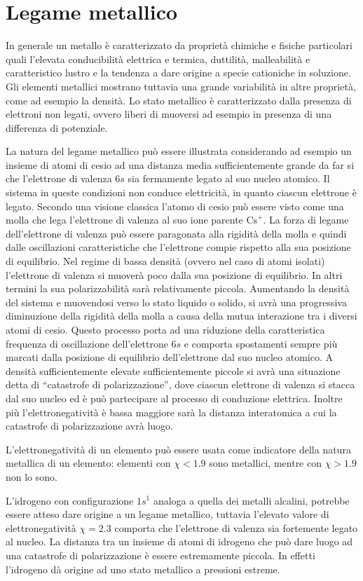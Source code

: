 \section{Legame metallico}
In generale un metallo è caratterizzato da proprietà chimiche e fisiche particolari quali l'elevata conducibilità elettrica e termica, duttilità, malleabilità e caratteristico lustro e la tendenza a dare origine a specie cationiche in soluzione. Gli elementi metallici mostrano tuttavia una grande variabilità in altre proprietà, come ad esempio la densità. Lo stato metallico è caratterizzato dalla presenza di elettroni non legati, ovvero liberi di muoversi ad esempio in presenza di una differenza di potenziale. 

La natura del legame metallico può essere illustrata considerando ad esempio un insieme di atomi di cesio ad una distanza media sufficientemente grande da far si che l'elettrone di valenza $6s$ sia fermamente legato al suo nucleo atomico. Il sistema in queste condizioni non conduce elettricità, in quanto ciascun elettrone è legato. Secondo una visione classica l'atomo di cesio può essere visto come una molla che lega l'elettrone di valenza al suo ione parente $\text{Cs}^+$. La forza di legame dell'elettrone di valenza può essere paragonata alla rigidità della molla e quindi dalle oscillazioni caratteristiche che l'elettrone compie rispetto alla sua posizione di equilibrio. Nel regime di bassa densità (ovvero nel caso di atomi isolati) l'elettrone di valenza si muoverà poco dalla sua posizione di equilibrio. In altri termini la sua polarizzabilità sarà relativamente piccola. Aumentando la densità del sistema e muovendosi verso lo stato liquido o solido, si avrà una progressiva diminuzione della rigidità della molla a causa della mutua interazione tra i diversi atomi di cesio. Questo processo porta ad una riduzione della caratteristica frequenza di oscillazione dell'elettrone $6s$ e comporta spostamenti sempre più marcati dalla posizione di equilibrio dell'elettrone dal suo nucleo atomico. A densità sufficientemente elevate sufficientemente piccole si avrà una situazione detta di ``catastrofe di polarizzazione'', dove ciascun elettrone di valenza si stacca dal suo nucleo ed è può partecipare al processo di conduzione elettrica. Inoltre più l'elettronegatività è bassa maggiore sarà la distanza interatomica a cui la catastrofe di polarizzazione avrà luogo.
\begin{obs}
    L'elettronegatività di un elemento può essere usata come indicatore della natura metallica di un elemento: elementi con $\chi<1.9$ sono metallici, mentre con $\chi>1.9$ non lo sono.
\end{obs}
\begin{ex}
    L'idrogeno con configurazione $1s^1$ analoga a quella dei metalli alcalini, potrebbe essere atteso dare origine a un legame metallico, tuttavia l'elevato valore di elettronegatività $\chi=2.3$ comporta che l'elettrone di valenza sia fortemente legato al nucleo. La distanza tra un insieme di atomi di idrogeno che può dare luogo ad una catastrofe di polarizzazione è essere estremamente piccola. In effetti l'idrogeno dà origine ad uno stato metallico a pressioni estreme.
\end{ex}

